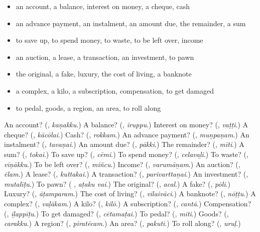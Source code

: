 \begin{itemize}
\raggedright
  \item an account, a balance, interest on money, a cheque, cash
  \item an advance payment, an instalment, an amount due, the remainder, a sum
  \item to save up, to spend money, to waste, to be left over, income
  \item an auction, a lease, a transaction, an investment, to pawn
  \item the original, a fake, luxury, the cost of living, a banknote
  \item a complex, a kilo, a subscription, compensation, to get damaged
  \item to pedal, goods, a region, an area, to roll along
\end{itemize}

\begin{tcolorbox}[breakable,colback=teal!4,colframe=teal!35!black,title={Before you move on}]
An account? (\textbf{}, \emph{kaṇakku}.) A balance? (\textbf{}, \emph{iruppu}.) Interest on money? (\textbf{}, \emph{vaṭṭi}.) A cheque? (\textbf{}, \emph{kācōlai}.) Cash? (\textbf{}, \emph{rokkam}.) An advance payment? (\textbf{}, \emph{muṉpaṇam}.) An instalment? (\textbf{}, \emph{tavaṇai}.) An amount due? (\textbf{}, \emph{pākki}.) The remainder? (\textbf{}, \emph{mīti}.) A sum? (\textbf{}, \emph{tokai}.) To save up? (\textbf{}, \emph{cēmi}.) To spend money? (\textbf{}, \emph{celavaḻi}.) To waste? (\textbf{}, \emph{vīṇākku}.) To be left over? (\textbf{}, \emph{miñcu}.) Income? (\textbf{}, \emph{varumāṉam}.) An auction? (\textbf{}, \emph{ēlam}.) A lease? (\textbf{}, \emph{kuttakai}.) A transaction? (\textbf{}, \emph{parivarttaṉai}.) An investment? (\textbf{}, \emph{mutalīṭu}.) To pawn? (\textbf{ }, \emph{aṭaku vai}.) The original? (\textbf{}, \emph{acal}.) A fake? (\textbf{}, \emph{pōli}.) Luxury? (\textbf{}, \emph{āṭamparam}.) The cost of living? (\textbf{}, \emph{vilaivāci}.) A banknote? (\textbf{}, \emph{nōṭṭu}.) A complex? (\textbf{}, \emph{vaḷākam}.) A kilo? (\textbf{}, \emph{kilō}.) A subscription? (\textbf{}, \emph{cantā}.) Compensation? (\textbf{}, \emph{iḻappīṭu}.) To get damaged? (\textbf{}, \emph{cētamaṭai}.) To pedal? (\textbf{}, \emph{miti}.) Goods? (\textbf{}, \emph{carakku}.) A region? (\textbf{}, \emph{piratēcam}.) An area? (\textbf{}, \emph{pakuti}.) To roll along? (\textbf{}, \emph{uruḷ}.)
\end{tcolorbox}

